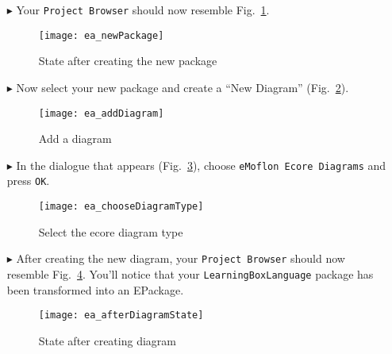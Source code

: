 \begin{itemize}
\vspace{0.5cm}

\item[$\blacktriangleright$] Your \texttt{Project Browser} should now resemble Fig.~\ref{ea:newPackageComplete}.

\vspace{0.5cm}

\begin{figure}[htbp]
	\centering
  \texttt{[image: ea\_newPackage]}
	\caption{State after creating the new package}
	\label{ea:newPackageComplete}
\end{figure}
\FloatBarrier

\vspace{0.5cm}

\item[$\blacktriangleright$] Now select your new package and create a ``New Diagram'' (Fig.~\ref{ea:newDiagram}).

\vspace{0.5cm}

\begin{figure}[htbp]
	\centering
  \texttt{[image: ea\_addDiagram]}
	\caption{Add a diagram}
	\label{ea:newDiagram}
\end{figure}
\FloatBarrier

\clearpage

\item[$\blacktriangleright$] In the dialogue that appears (Fig.~\ref{ea:diagramType}), choose \texttt{eMoflon Ecore Diagrams} and press \texttt{OK}. 

\begin{figure}[htbp]
	\centering
  \texttt{[image: ea\_chooseDiagramType]}
	\caption{Select the ecore diagram type}
	\label{ea:diagramType}
\end{figure}
\FloatBarrier

 
\item[$\blacktriangleright$] After creating the new diagram, your  \texttt{Project Browser} should now resemble Fig.~\ref{ea:diagramComplete}. You'll notice
that your \texttt{LearningBoxLanguage} package has been transformed into an EPackage.

\begin{figure}[htbp]
	\centering
  \texttt{[image: ea\_afterDiagramState]}
	\caption{State after creating diagram}
	\label{ea:diagramComplete}
\end{figure}
\FloatBarrier


\end{itemize}
